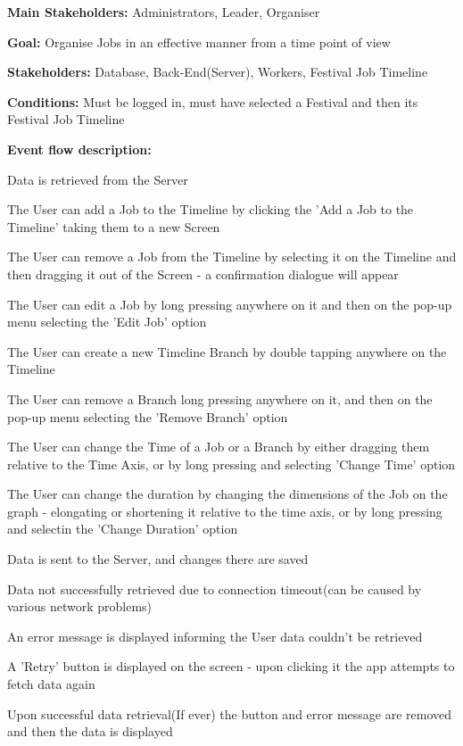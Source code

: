 			\noindent {}
			\begin{packed_item}
				\item \textbf{Main Stakeholders:} Administrators, Leader, Organiser
				\item \textbf{Goal:} Organise Jobs in an effective manner from a time point of view
				\item \textbf{Stakeholders: } Database, Back-End(Server), Workers, Festival Job Timeline
				\item \textbf{Conditions: } Must be logged in, must have selected a Festival and then its Festival Job Timeline
				\item \textbf{Event flow description: }
				\begin{packed_enum}
					\item Data is retrieved from the Server
					\item The User can add a Job to the Timeline by clicking the 'Add a Job to the Timeline' taking them to a new Screen
					\item The User can remove a Job from the Timeline by selecting it on the Timeline and then dragging it out of the Screen - a confirmation dialogue will appear
					\item The User can edit a Job by long pressing anywhere on it and then on the pop-up menu selecting the 'Edit Job' option
					\item The User can create a new Timeline Branch by double tapping anywhere on the Timeline
					\item The User can remove a Branch long pressing anywhere on it, and then on the pop-up menu selecting the 'Remove Branch' option
					\item The User can change the Time of a Job or a Branch by either dragging them relative to the Time Axis, or by long pressing and selecting 'Change Time' option
					\item The User can change the duration by changing the dimensions of the Job on the graph - elongating or shortening it relative to the time axis, or by long pressing and selectin the 'Change Duration' option
					\item Data is sent to the Server, and changes there are saved
				\end{packed_enum}
				
				\begin{packed_item}
					\item[1.a] Data not successfully retrieved due to connection timeout(can be caused by various network problems)
					\item[] \begin{packed_enum}
						\item An error message is displayed informing the User data couldn't be retrieved
						\item A 'Retry' button is displayed on the screen - upon clicking it the app attempts to fetch data again
						\item Upon successful data retrieval(If ever) the button and error message are removed and then the data is displayed
					\end{packed_enum}
					

\end{packed_item}
\end{packed_item}
